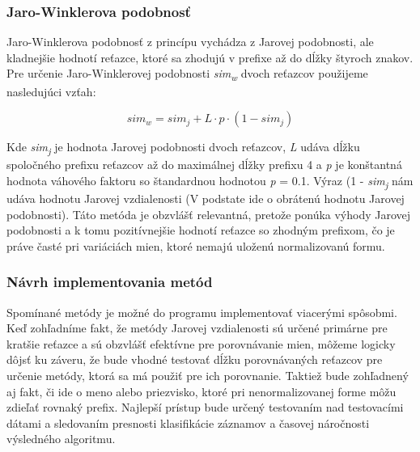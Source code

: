 \subsubsection{Jaro-Winklerova podobnosť}

Jaro-Winklerova podobnosť z princípu vychádza z Jarovej podobnosti, ale kladnejšie hodnotí
reťazce, ktoré sa zhodujú v prefixe až do dĺžky štyroch znakov. Pre určenie Jaro-Winklerovej
podobnosti \textit{sim\textsubscript{w}} dvoch reťazcov použijeme nasledujúci vzťah:

\begin{equation*}
    sim_{w} = sim_{j} + L \cdot p \cdot (1 - sim_{j})
\end{equation*}

Kde \textit{sim\textsubscript{j}} je hodnota Jarovej podobnosti dvoch reťazcov, \textit{L} udáva dĺžku spoločného prefixu
reťazcov až do maximálnej dĺžky prefixu 4 a \textit{p} je konštantná hodnota váhového faktoru so
štandardnou hodnotou \textit{p} = 0.1. Výraz (1 - \textit{sim\textsubscript{j}} nám udáva hodnotu Jarovej vzdialenosti (V
podstate ide o obrátenú hodnotu Jarovej podobnosti).
Táto metóda je obzvlášť relevantná, pretože ponúka výhody Jarovej podobnosti a k tomu
pozitívnejšie hodnotí reťazce so zhodným prefixom, čo je práve časté pri variáciách mien,
ktoré nemajú uloženú normalizovanú formu.

\subsubsection{Návrh implementovania metód}

Spomínané metódy je možné do programu implementovať viacerými spôsobmi. Keď
zohľadníme fakt, že metódy Jarovej vzdialenosti sú určené primárne pre kratšie reťazce a sú
obzvlášť efektívne pre porovnávanie mien, môžeme logicky dôjsť ku záveru, že bude vhodné
testovať dĺžku porovnávaných reťazcov pre určenie metódy, ktorá sa má použiť pre ich
porovnanie. Taktiež bude zohľadnený aj fakt, či ide o meno alebo priezvisko, ktoré pri
nenormalizovanej forme môžu zdieľať rovnaký prefix. Najlepší prístup bude určený
testovaním nad testovacími dátami a sledovaním presnosti klasifikácie záznamov a časovej
náročnosti výsledného algoritmu.

